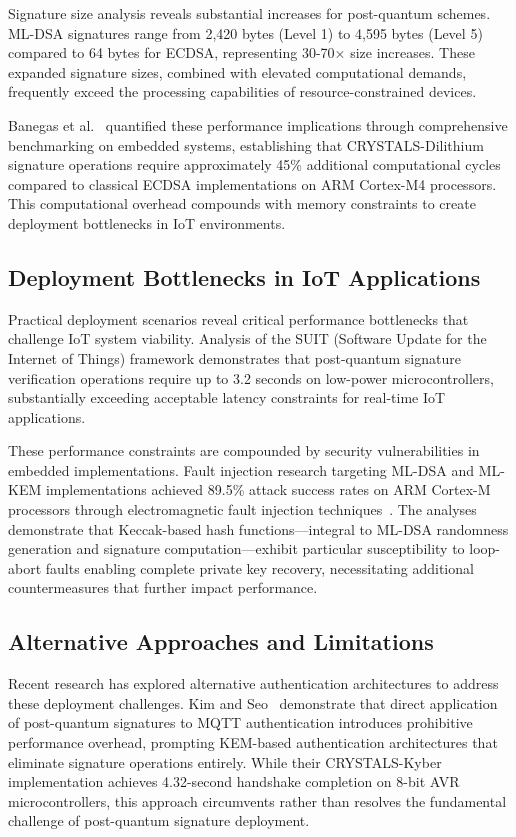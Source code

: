 \documentclass[journal=tches,final]{iacrtrans}
\begin{document}
Signature size analysis reveals substantial increases for post-quantum schemes. ML-DSA signatures range from 2,420 bytes (Level 1) to 4,595 bytes (Level 5) compared to 64 bytes for ECDSA, representing 30-70× size increases. These expanded signature sizes, combined with elevated computational demands, frequently exceed the processing capabilities of resource-constrained devices.

Banegas et al.~\cite{Banegas2021} quantified these performance implications through comprehensive benchmarking on embedded systems, establishing that CRYSTALS-Dilithium signature operations require approximately 45\% additional computational cycles compared to classical ECDSA implementations on ARM Cortex-M4 processors. This computational overhead compounds with memory constraints to create deployment bottlenecks in IoT environments.

\subsection{Deployment Bottlenecks in IoT Applications}

Practical deployment scenarios reveal critical performance bottlenecks that challenge IoT system viability. Analysis of the SUIT (Software Update for the Internet of Things) framework demonstrates that post-quantum signature verification operations require up to 3.2 seconds on low-power microcontrollers, substantially exceeding acceptable latency constraints for real-time IoT applications.

These performance constraints are compounded by security vulnerabilities in embedded implementations. Fault injection research targeting ML-DSA and ML-KEM implementations achieved 89.5\% attack success rates on ARM Cortex-M processors through electromagnetic fault injection techniques~\cite{Li2024}. The analyses demonstrate that Keccak-based hash functions—integral to ML-DSA randomness generation and signature computation—exhibit particular susceptibility to loop-abort faults enabling complete private key recovery, necessitating additional countermeasures that further impact performance.

\subsection{Alternative Approaches and Limitations}

Recent research has explored alternative authentication architectures to address these deployment challenges. Kim and Seo~\cite{Kim2025} demonstrate that direct application of post-quantum signatures to MQTT authentication introduces prohibitive performance overhead, prompting KEM-based authentication architectures that eliminate signature operations entirely. While their CRYSTALS-Kyber implementation achieves 4.32-second handshake completion on 8-bit AVR microcontrollers, this approach circumvents rather than resolves the fundamental challenge of post-quantum signature deployment.
\end{document}

